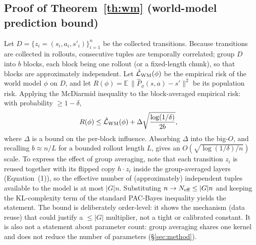 \documentclass[preprint,12pt]{elsarticle}
\begin{document}
\subsection{Proof of Theorem~\ref{th:wm} (world-model prediction bound)}
Let $D=\{z_i=(s_i,a_i,s'_i)\}_{i=1}^n$ be the collected transitions. Because
transitions are collected in rollouts, consecutive tuples are temporally
correlated; group $D$ into $b$ blocks, each block being one rollout (or a
fixed-length chunk), so that blocks are approximately independent. Let
$\hat{\mathcal L}_{\rm WM}(\phi)$ be the empirical risk of the world model
$\phi$ on $D$, and let $R(\phi)=\mathbb E\,\|\hat P_\phi(s,a)-s'\|^2$ be its
population risk. Applying the McDiarmid inequality to the block-averaged
empirical risk: with probability $\ge1-\delta$,
\[
  R(\phi)\le \hat{\mathcal L}_{\rm WM}(\phi)+
  \Delta\sqrt{\frac{\log(1/\delta)}{2b}},
\]
where $\Delta$ is a bound on the per-block influence. Absorbing $\Delta$ into
the big-$O$, and recalling $b\approx n/L$ for a bounded rollout length $L$,
gives an $O(\sqrt{\log(1/\delta)/n})$ scale. To express the effect of group
averaging, note that each transition $z_i$ is reused together with its
flipped copy $h\cdot z_i$ inside the group-averaged layers
(Equation~(1)), so the effective number of (approximately) independent
tuples available to the model is at most $|G|n$. Substituting $n \to
N_{\rm eff}\le |G|n$ and keeping the KL-complexity term of the standard
PAC-Bayes inequality yields the statement. The bound is deliberately
order-level: it shows the mechanism (data reuse) that could justify a
$\le|G|$ multiplier, not a tight or calibrated constant. It is also not a
statement about parameter count: group averaging shares one kernel and does
not reduce the number of parameters (\S\ref{sec:method}).
\end{document}
